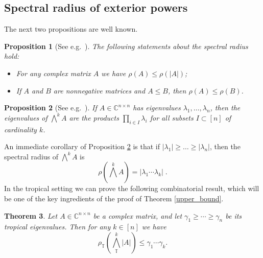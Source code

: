 \documentclass[a4paper]{amsart}
\theoremstyle{definition}
\theoremstyle{plain}
\newtheorem{thm}{Theorem}
\newtheorem{prop}[thm]{Proposition}
\theoremstyle{remark}
\begin{document}
\subsection{Spectral radius of exterior powers}
The next two propositions are well known.
\begin{prop}[See e.g.\ {\cite[Theorem 8.1.18]{horn}}]
 \label{spectral_radius_inequalities}
 The following statements about the spectral radius hold:
 \begin{itemize}
  \item[(a)] For any complex matrix $A$ we have $\rho(A){\leqslant}\rho(|A|)$;
  \item[(b)] If $A$ and $B$ are nonnegative matrices and $A{\leqslant} B$, then $\rho(A){\leqslant}\rho(B)$.
 \end{itemize}
\end{prop}
\begin{prop}[See e.g.\ {\cite[2.15.12]{marcus}}]
 \label{rho_exterior_power}
 If $A \in \mathbb{C}^{n \times n}$ has eigenvalues $\lambda_1, \dots, \lambda_n$, then the eigenvalues of ${\mbox{$\bigwedge$}}^k A$ are 
 the products $\prod_{i \in I} \lambda_i$ for all subsets $I \subset [n]$
of cardinality $k$.
\end{prop}

An immediate corollary of Proposition \ref{rho_exterior_power} is that if $|\lambda_1| {\geqslant} \dots {\geqslant} |\lambda_n|$, 
then the spectral radius of ${\mbox{$\bigwedge$}}^k A$ is 
\[
 \rho({\mbox{$\bigwedge$}}^k A) = |\lambda_1 \dotsm \lambda_k| \;  .
\]
In the tropical setting we can prove the following combinatorial result,
which will be one of the key ingredients of the proof of Theorem \ref{upper_bound}.

\begin{thm}
 \label{rho_tropical_exterior_power}
 Let $A \in {\mathbb{C}}^{n \times n}$ be a complex matrix, and let $\gamma_1 {\geqslant} \cdots {\geqslant} \gamma_n$ be its tropical eigenvalues.
 Then for any $k \in [n]$ we have 
 \[
  \rho_{{\mathbb{T}}}({\mbox{$\bigwedge$}}^k_{{\mathbb{T}}} |A|) {\leqslant} \gamma_1 \dotsm \gamma_k.
 \]
\end{thm}
\end{document}

